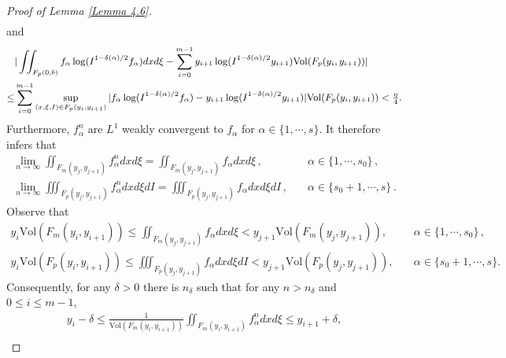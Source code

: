 \documentclass[reqno,11pt]{amsart}
\numberwithin{equation}{section}
\begin{document}
\begin{proof}[Proof of Lemma \ref{Lemma 4.6}]
\begin{equation}
\begin{aligned}
		\end{aligned}
	\end{equation}
and
\begin{equation}\label{V2}{\small
		\begin{aligned}
			& |\iint_{F_p(0,b)} f_\alpha \log ( I^{1 - \delta (\alpha) / 2} f_\alpha )  dxd\xi  - \sum_{i=0}^{m-1} y_{i+1} \log ( I^{1 - \delta (\alpha) / 2} y_{i+1} ) \mathrm{Vol} (F_p (y_i, y_{i+1})) | \\
			\leq & \sum_{i=0}^{m-1} \sup \limits_{(x,\xi, I) \in F_p (y_i ,y_{i+1})} |f_\alpha \log ( I^{1 - \delta (\alpha) / 2} f_\alpha )  - y_{i+1} \log ( I^{1 - \delta (\alpha) / 2} y_{i+1} ) | \mathrm{Vol} (F_p (y_i, y_{i+1})) < \tfrac{\eta }{4}.
		\end{aligned}}
	\end{equation}
Furthermore, $f_\alpha^n$ are $L^1$ weakly convergent to $f_\alpha$ for $\alpha \in \{ 1, \cdots, s \}$. It therefore infers that
\begin{equation*}
  \begin{aligned}
    \lim_{n \to \infty} \iint_{F_m (y_j, y_{j+1})} f_\alpha^n dxd\xi = \iint_{F_m (y_j, y_{j+1})} f_\alpha dxd\xi \,, \quad & \alpha \in \{ 1, \cdots, s_0 \} \,, \\
    \lim_{n \to \infty} \iiint_{F_p (y_j, y_{j+1})} f_\alpha^n dxd\xi d I = \iiint_{F_p (y_j, y_{j+1})} f_\alpha dxd\xi d I \,, \quad & \alpha \in \{s_0 + 1, \cdots, s \} \,.
  \end{aligned}
\end{equation*}
Observe that
\begin{equation*}
\begin{aligned}
		y_i \mathrm{Vol} (F_m (y_i ,y_{i+1})) \leq \iint_{F_m (y_j, y_{j+1})} f_\alpha dxd\xi <y_{j+1} \mathrm{Vol} (F_m (y_j, y_{j+1})) , \quad & \alpha \in \{ 1, \cdots, s_0 \} \,, \\
y_i \mathrm{Vol} (F_p (y_i ,y_{i+1})) \leq \iiint_{F_p (y_j, y_{j+1})} f_\alpha dxd\xi d I <y_{j+1} \mathrm{Vol} (F_p (y_j, y_{j+1})), \quad & \alpha \in \{s_0 + 1, \cdots, s \} .
\end{aligned}
\end{equation*}
Consequently, for any $\delta > 0$ there is $n_\delta$ such that for any $n>n_\delta $ and $0\leq i \leq m-1 $, 
	\begin{equation}\label{eq4.34}
\begin{aligned}
		y_i -\delta \leq \tfrac{1}{\mathrm{Vol} (F_m(y_i, y_{i+1}))} \iint_{F_m(y_i, y_{i+1})} f^n_\alpha dxd\xi \leq y_{i+1} + \delta , \\

\end{aligned}
\end{equation}
\end{proof}
\end{document}
